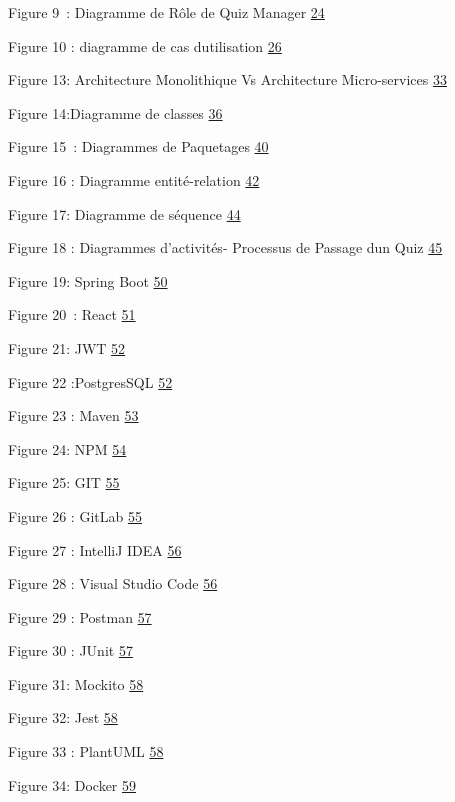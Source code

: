 \documentclass[12pt,a4paper,twoside]{report}
\begin{document}
Figure 9~: Diagramme de Rôle de Quiz Manager
\protect\hyperlink{_Toc203823421}{24}

Figure 10 : diagramme de cas d\textquotesingle utilisation
\protect\hyperlink{_Toc203823422}{26}

Figure 13: Architecture Monolithique Vs Architecture Micro-services
\protect\hyperlink{_Toc203823423}{33}

Figure 14:Diagramme de classes \protect\hyperlink{_Toc203823424}{36}

Figure 15~: Diagrammes de Paquetages
\protect\hyperlink{_Toc203823425}{40}

Figure 16 : Diagramme entité-relation
\protect\hyperlink{_Toc203823426}{42}

Figure 17: Diagramme de séquence \protect\hyperlink{_Toc203823427}{44}

Figure 18 : Diagrammes d'activités- Processus de Passage
d\textquotesingle un Quiz \protect\hyperlink{_Toc203823428}{45}

Figure 19: Spring Boot \protect\hyperlink{_Toc203823429}{50}

Figure 20~: React \protect\hyperlink{_Toc203823430}{51}

Figure 21: JWT \protect\hyperlink{_Toc203823431}{52}

Figure 22 :PostgresSQL \protect\hyperlink{_Toc203823432}{52}

Figure 23 : Maven \protect\hyperlink{_Toc203823433}{53}

Figure 24: NPM \protect\hyperlink{_Toc203823434}{54}

Figure 25: GIT \protect\hyperlink{_Toc203823435}{55}

Figure 26 : GitLab \protect\hyperlink{_Toc203823436}{55}

Figure 27 : IntelliJ IDEA \protect\hyperlink{_Toc203823437}{56}

Figure 28 : Visual Studio Code \protect\hyperlink{_Toc203823438}{56}

Figure 29 : Postman \protect\hyperlink{_Toc203823439}{57}

Figure 30 : JUnit \protect\hyperlink{_Toc203823440}{57}

Figure 31: Mockito \protect\hyperlink{_Toc203823441}{58}

Figure 32: Jest \protect\hyperlink{_Toc203823442}{58}

Figure 33 : PlantUML \protect\hyperlink{_Toc203823443}{58}

Figure 34: Docker \protect\hyperlink{_Toc203823444}{59}
\end{document}
